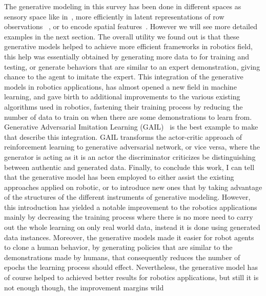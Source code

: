The generative modeling in this survey has been done in different spaces as sensory space like in~\cite{nair2018visual}, more efficiently in latent representations of row observations~\cite{fujimoto2018addressing} , or to encode spatial features~\cite{finn2016deep}. However we will see more detailed examples in the next section. The overall utility we found out is that these generative models helped to achieve more efficient frameworks in robotics field, this help was essentially obtained by generating more data to for training and testing, or generate behaviors that are similar to an expert demonstration, giving chance to the agent to imitate the expert. This integration of the generative models in robotics applications, has almost opened a new field in machine learning, and gave birth to additional improvements to the various existing algorithms used in robotics, fastening their training process by reducing the number of data to train on when there are some demonstrations to learn from. Generative Adversarial Imitation Learning (GAIL)~\cite{DBLP:journals/corr/HoE16} is the best example to make that describe this integration. GAIL transforms the actor-critic approach of reinforcement learning to generative adversarial network, or vice versa, where the generator is acting as it is an actor the discriminator criticizes be distinguishing between authentic and generated data.
Finally, to conclude this work, I can tell that the generative model has been employed to either assist the existing approaches applied on robotic, or to introduce new ones that by taking advantage of the structures of the different instruments of generative modeling. However, this introduction has yielded a notable improvement to the robotics applications mainly by decreasing the training process where there is no more need to carry out the whole learning on only real world data, instead it is done using generated data instances. Moreover, the generative models made it easier for robot agents to clone a human behavior, by generating policies that are similar to the demonstrations made by humans, that consequently reduces the number of epochs the learning process should effect. Nevertheless, the generative model has of course helped to achieved better results for robotics applications, but still it is not enough though, the improvement margins wild
\clearpage{\pagestyle{empty}\cleardoublepage}